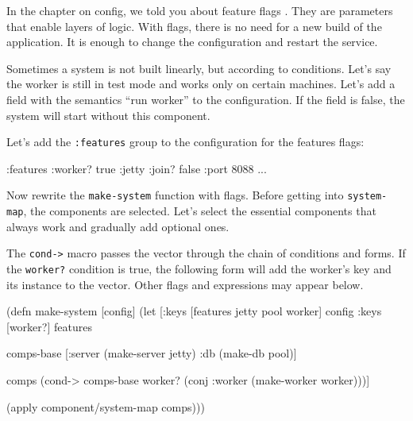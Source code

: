 
In the chapter on config, we told you about feature flags . They are parameters that enable layers of logic. With flags, there is no need for a new build of the application. It is enough to change the configuration and restart the service.

Sometimes a system is not built linearly, but according to conditions. Let's say the worker is still in test mode and works only on certain machines. Let's add a field with the semantics ``run worker'' to the configuration. If the field is false, the system will start without this component.


Let's add the \verb|:features| group to the configuration for the features flags:

\begin{english}
  \begin{clojure}
{:features {:worker? true}
 :jetty {:join? false :port 8088}
 ...}
  \end{clojure}
\end{english}

Now rewrite the \verb|make-system| function with flags. Before getting into \verb|system-map|, the components are selected. Let's select the essential components that always work and gradually add optional ones.

The \verb|cond->| macro passes the vector through the chain of conditions and forms. If the \verb|worker?| condition is true, the following form will add the worker's key and its instance to the vector. Other flags and expressions may appear below.

\ifnarrow

\begin{english}
  \begin{clojure}
(defn make-system [config]
  (let [{:keys [features
                jetty
                pool
                worker]} config
        {:keys [worker?]} features

        comps-base
        [:server (make-server jetty)
         :db     (make-db pool)]

        comps (cond-> comps-base
                worker?
                (conj :worker
                  (make-worker worker)))]

    (apply component/system-map comps)))
  \end{clojure}
\end{english}

